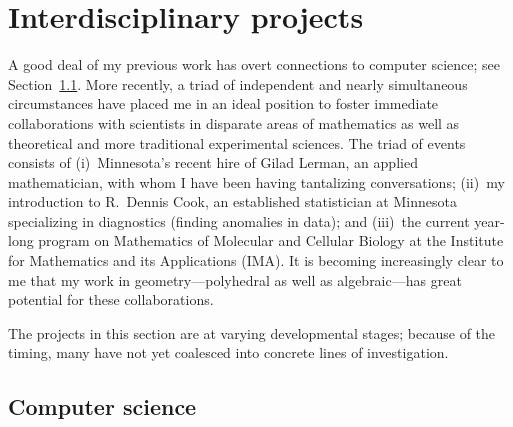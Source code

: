 \documentclass[11pt]{proposal}
\begin{document}
\section{Interdisciplinary projects}%


\label{s:inter}


A good deal of my previous work has overt connections to computer
science; see Section~\ref{cs}.  More recently, a triad of independent
and nearly simultaneous circumstances have placed me in an ideal
position to foster immediate collaborations with scientists in
disparate areas of mathematics as well as theoretical and more
traditional experimental sciences.  The triad of events consists of
(i)~Minnesota's recent hire of Gilad Lerman, an applied mathematician,
with whom I have been having tantalizing conversations; (ii)~my
introduction to R.~Dennis Cook, an established statistician at
Minnesota specializing in diagnostics (finding anomalies in data); and
(iii)~the current year-long program on Mathematics of Molecular and
Cellular Biology at the Institute for Mathematics and its Applications
(IMA).  It is becoming increasingly clear to me that my work in
geometry---polyhedral as well as algebraic---has great potential for
these collaborations.

The projects in this section are at varying developmental stages;
because of the timing, many have not yet coalesced into concrete lines
of investigation.

\subsection{Computer science}\label{cs}%
\end{document}
